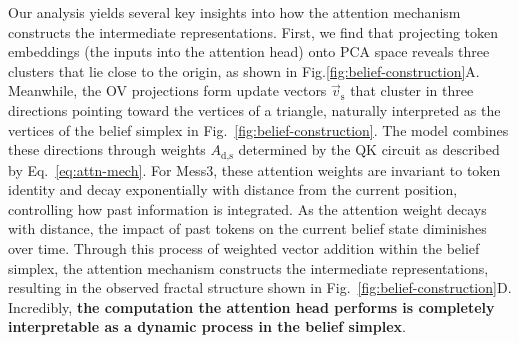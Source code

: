 \documentclass{article}
\theoremstyle{plain}
\theoremstyle{definition}
\theoremstyle{remark}
\begin{document}
Our analysis yields several key insights into how the attention mechanism constructs the intermediate representations.
First, we find that projecting token embeddings (the inputs into the attention head) onto PCA space reveals three clusters that lie close to the origin, as shown in Fig.\ref{fig:belief-construction}A.
Meanwhile, the OV projections form update vectors $\vec{v}_\text{s}$ that cluster in three directions %
pointing toward
the vertices of a triangle,
naturally interpreted as the vertices of the belief simplex in Fig.~\ref{fig:belief-construction}.
The model combines these directions through weights $A_{\text{d,s}}$ determined by the QK circuit as described by Eq.~\eqref{eq:attn-mech}. 
For Mess3, these attention weights are invariant to token identity and decay exponentially with distance from the current position, controlling how past information is integrated. As the attention weight decays with distance, the impact of past tokens on the current belief state diminishes over time.
Through this process of weighted vector addition within the belief simplex, the attention mechanism constructs the intermediate representations, resulting in the observed fractal structure shown in Fig.~\ref{fig:belief-construction}D. Incredibly, \textbf{the computation the attention head performs is completely interpretable as a dynamic process in the belief simplex}.

\end{document}
